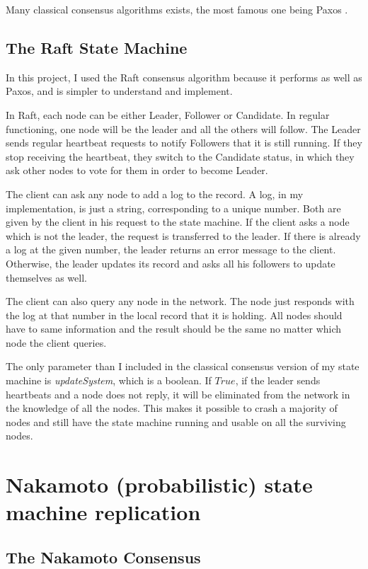 \documentclass[11pt, twocolumn]{article}
\begin{document}
Many classical consensus algorithms exists, the most famous one being Paxos \cite{parliament}.
\subsection{The Raft State Machine}
In this project, I used the Raft consensus algorithm \cite{understandable} because it performs as well as Paxos, and is simpler to understand and implement.

In Raft, each node can be either Leader, Follower or Candidate. In regular functioning, one node will be the leader and all the others will follow.
The Leader sends regular heartbeat requests to notify Followers that it is still running. If they stop receiving the heartbeat, they switch to the Candidate status, in which they ask other nodes to vote for them in order to become Leader.

The client can ask any node to add a log to the record. A log, in my implementation, is just a string, corresponding to a unique number. Both are given by the client in his request to the state machine.
If the client asks a node which is not the leader, the request is transferred to the leader. If there is already a log at the given number,
the leader returns an error message to the client. Otherwise, the leader updates its record and asks all his followers to update themselves as well.

The client can also query any node in the network. The node just responds with the log at that number in the local record that it is holding. All nodes should have to same information and the result should be the same no matter which node the client queries.

The only parameter than I included in the classical consensus version of my state machine is \emph{updateSystem}, which is a boolean. If $True$, if the leader sends heartbeats and a node does not reply,
it will be eliminated from the network in the knowledge of all the nodes. This makes it possible to
crash a majority of nodes and still have the state machine running and usable on all the surviving nodes.

\section{Nakamoto (probabilistic) state machine replication}
\subsection{The Nakamoto Consensus}
\end{document}
